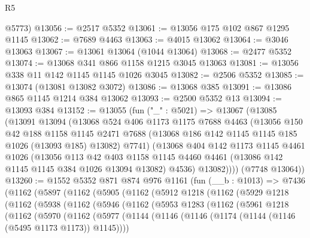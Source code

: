 \begin{lexlean}{R5}
\begin{coremodule}
      @5773)
@13056 := @2517 @5352
@13061 := @13056 @175 @102 @867 @1295 @1145
@13062 := @7689 @4463
@13063 := @4015 @13062
@13064 := @3046 @13063
@13067 := @13061 @13064 (@1044 @13064)
@13068 := @2477 @5352
@13074 := @13068 @341 @866 @1158 @1215 @3045 @13063
@13081 := @13056 @338 @11 @142 @1145 @1145 @1026 @3045
@13082 := @2506 @5352
@13085 := @13074 (@13081 @13082 @3072)
@13086 := @13068 @385
@13091 := @13086 @865 @1145 @1214 @384 @13062
@13093 := @2500 @5352 @13
@13094 := @13093 @384
@13152 := @13055
    (fun ("_" : @5021) =>
    @13067
      (@13085
        (@13091
          @13094
          (@13068
            @524
            @406
            @1173
            @1175
            @7688
            @4463
            (@13056
              @150
              @42
              @188
              @1158
              @1145
              @2471
              @7688
              (@13068 @186 @142 @1145 @1145 @185 @1026 (@13093 @185) @13082)
              @7741)
            (@13068
              @404
              @142
              @1173
              @1145
              @4461
              @1026
              (@13056
                @113
                @42
                @403
                @1158
                @1145
                @4460
                @4461
                (@13086 @142 @1145 @1145 @384 @1026 @13094 @13082)
                @4536)
              @13082))))
      (@7748 @13064))
@13260 := @1552
    @5352
    @871
    @874
    @976
    @1161
    (fun (__b : @1013) =>
    @7436
      (@1162
        (@5897
          (@1162
            (@5905
              (@1162
                (@5912
                  @1218
                  (@1162
                    (@5929
                      @1218
                      (@1162
                        (@5938
                          (@1162
                            (@5946
                              (@1162
                                (@5953
                                  @1283
                                  (@1162
                                    (@5961
                                      @1218
                                      (@1162
                                        (@5970
                                          (@1162
                                            (@5977
                                              (@1144
                                                (@1146
                                                  (@1146
                                                    (@1174
                                                      (@1144 (@1146 (@5495 @1173 @1173)) @1145))))

\end{coremodule}
\end{lexlean}
